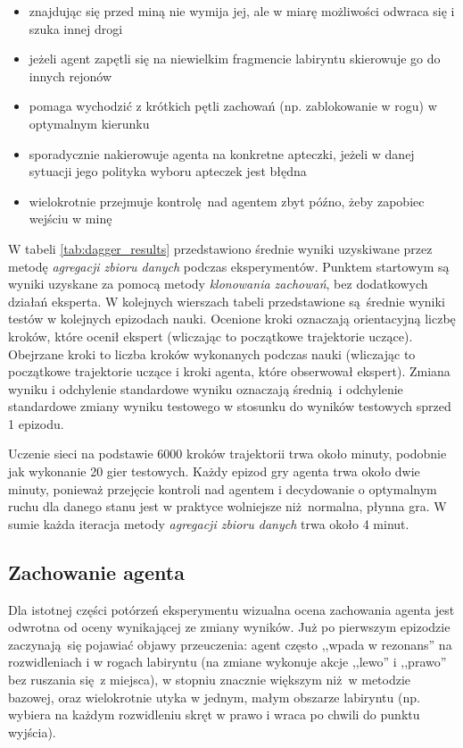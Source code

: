 \begin{itemize}
\item{znajdując się przed miną nie wymija jej, ale w miarę możliwości odwraca się i szuka innej drogi}
\item{jeżeli agent zapętli się na niewielkim fragmencie labiryntu skierowuje go do innych rejonów}
\item{pomaga wychodzić z krótkich pętli zachowań (np. zablokowanie w rogu) w optymalnym kierunku}
\item{sporadycznie nakierowuje agenta na konkretne apteczki, jeżeli w danej sytuacji jego polityka wyboru apteczek jest błędna}
\item{wielokrotnie przejmuje kontrolę nad agentem zbyt późno, żeby zapobiec wejściu w minę}
\end{itemize}

W tabeli \ref{tab:dagger_results} przedstawiono średnie wyniki uzyskiwane przez metodę \textit{agregacji zbioru danych} podczas eksperymentów. Punktem startowym są wyniki uzyskane za pomocą metody \textit{klonowania zachowań}, bez dodatkowych działań eksperta. W kolejnych wierszach tabeli przedstawione są średnie wyniki testów w kolejnych epizodach nauki. Ocenione kroki oznaczają orientacyjną liczbę kroków, które ocenił ekspert (wliczając to początkowe trajektorie uczące). Obejrzane kroki to liczba kroków wykonanych podczas nauki (wliczając to początkowe trajektorie uczące i kroki agenta, które obserwował ekspert). Zmiana wyniku i odchylenie standardowe wyniku oznaczają średnią i odchylenie standardowe zmiany wyniku testowego w stosunku do wyników testowych sprzed 1 epizodu. 

Uczenie sieci na podstawie 6000 kroków trajektorii trwa około minuty, podobnie jak wykonanie 20 gier testowych. Każdy epizod gry agenta trwa około dwie minuty, ponieważ przejęcie kontroli nad agentem i decydowanie o optymalnym ruchu dla danego stanu jest w praktyce wolniejsze niż normalna, płynna gra. W sumie każda iteracja metody \textit{agregacji zbioru danych} trwa około 4 minut.

\begin{figure}[H]
\end{figure}

\subsection {Zachowanie agenta}
Dla istotnej części potórzeń eksperymentu wizualna ocena zachowania agenta jest odwrotna od oceny wynikającej ze zmiany wyników. Już po pierwszym epizodzie zaczynają się pojawiać objawy przeuczenia: agent często ,,wpada w rezonans'' na rozwidleniach i w rogach labiryntu (na zmiane wykonuje akcje ,,lewo'' i ,,prawo'' bez ruszania się z miejsca), w stopniu znacznie większym niż w metodzie bazowej, oraz wielokrotnie utyka w jednym, małym obszarze labiryntu (np. wybiera na każdym rozwidleniu skręt w prawo i wraca po chwili do punktu wyjścia).

